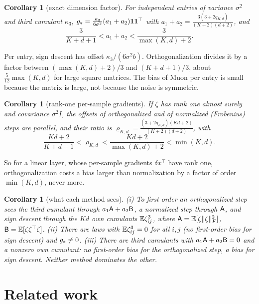 \documentclass{article}
\theoremstyle{plain}
\newtheorem{corollary}[theorem]{Corollary}
\theoremstyle{definition}
\theoremstyle{remark}
\begin{document}
\begin{corollary}[exact dimension factor]\label{cor:dim}
For independent entries of variance $\sigma^2$ and third cumulant $\kappa_3$,
$g_\ast=\frac{\kappa_3}{6\sigma^2}(a_1+a_2)\mathbf{1}\mathbf{1}^\top$ with
$a_1+a_2=\frac{3(3+2q_{K,d})}{(K+2)(d+2)}$, and
\[
\frac3{K+d+1}<a_1+a_2<\frac3{\max(K,d)+2}.
\]
\end{corollary}
Per entry, sign descent has offset $\kappa_3/(6\sigma^2b)$. Orthogonalization divides it by a factor between
$(\max(K,d)+2)/3$ and $(K+d+1)/3$, about $\frac5{12}\max(K,d)$ for large square matrices. The bias of Muon per entry
is small because the matrix is large, not because the noise is symmetric.

\begin{corollary}[rank-one per-sample gradients]\label{cor:rank1}
If $\zeta$ has rank one almost surely and covariance $\sigma^2I$, the offsets of orthogonalized and of normalized
(Frobenius) steps are parallel, and their ratio is
$\varrho_{K,d}=\frac{(3+2q_{K,d})(Kd+2)}{(K+2)(d+2)}$, with
\[
\frac{Kd+2}{K+d+1}<\varrho_{K,d}<\frac{Kd+2}{\max(K,d)+2}<\min(K,d).
\]
\end{corollary}
So for a linear layer, whose per-sample gradients $\delta x^\top$ have rank one, orthogonalization costs a bias larger
than normalization by a factor of order $\min(K,d)$, never more.

\begin{corollary}[what each method sees]\label{cor:compare}
\textup{(i)} To first order an orthogonalized step sees the third cumulant through $a_1\mathsf{A}+a_2\mathsf{B}$, a normalized step
through $\mathsf{A}$, and sign descent through the $Kd$ own cumulants $\mathbb{E}\zeta_{ij}^3$, where
$\mathsf{A}=\mathbb{E}[\zeta\|\zeta\|_{F}^2]$, $\mathsf{B}=\mathbb{E}[\zeta\zeta^\top\zeta]$. \textup{(ii)} There are laws with $\mathbb{E}\zeta_{ij}^3=0$ for all
$i,j$ (no first-order bias for sign descent) and $g_\ast\ne0$. \textup{(iii)} There are third cumulants with
$a_1\mathsf{A}+a_2\mathsf{B}=0$ and a nonzero own cumulant: no first-order bias for the orthogonalized step, a bias for sign descent.
Neither method dominates the other.
\end{corollary}


\section{Related work}\label{sec:related}
\end{document}
